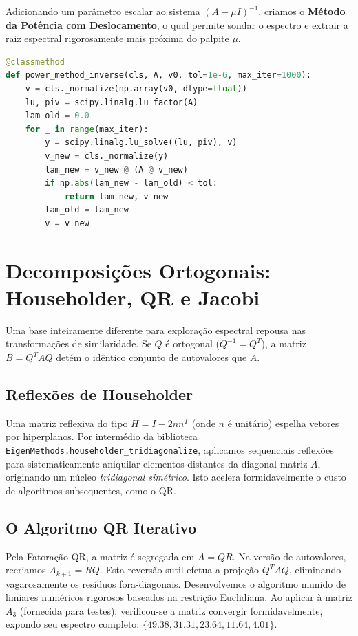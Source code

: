 \documentclass[12pt,a4paper]{article}
\begin{document}
Adicionando um parâmetro escalar ao sistema $(A - \mu I)^{-1}$, criamos o \textbf{Método da Potência com Deslocamento}, o qual permite sondar o espectro e extrair a raiz espectral rigorosamente mais próxima do palpite $\mu$.

\begin{lstlisting}[language=Python, caption={Extrato da Implementação da Potência Inversa com Fatoração LU}]
@classmethod
def power_method_inverse(cls, A, v0, tol=1e-6, max_iter=1000):
    v = cls._normalize(np.array(v0, dtype=float))
    lu, piv = scipy.linalg.lu_factor(A)
    lam_old = 0.0
    for _ in range(max_iter):
        y = scipy.linalg.lu_solve((lu, piv), v)
        v_new = cls._normalize(y)
        lam_new = v_new @ (A @ v_new)
        if np.abs(lam_new - lam_old) < tol:
            return lam_new, v_new
        lam_old = lam_new
        v = v_new
\end{lstlisting}

\section{Decomposições Ortogonais: Householder, QR e Jacobi}
Uma base inteiramente diferente para exploração espectral repousa nas transformações de similaridade. Se $Q$ é ortogonal ($Q^{-1} = Q^T$), a matriz $B = Q^T A Q$ detém o idêntico conjunto de autovalores que $A$.

\subsection{Reflexões de Householder}
Uma matriz reflexiva do tipo $H = I - 2nn^T$ (onde $n$ é unitário) espelha vetores por hiperplanos. Por intermédio da biblioteca \texttt{EigenMethods.householder\_tridiagonalize}, aplicamos sequenciais reflexões para sistematicamente aniquilar elementos distantes da diagonal matriz $A$, originando um núcleo \textit{tridiagonal simétrico}. 
Isto acelera formidavelmente o custo de algoritmos subsequentes, como o QR.

\subsection{O Algoritmo QR Iterativo}
Pela Fatoração QR, a matriz é segregada em $A = QR$. Na versão de autovalores, recriamos $A_{k+1} = R Q$.
Esta reversão sutil efetua a projeção $Q^T A Q$, eliminando vagarosamente os resíduos fora-diagonais. Desenvolvemos o algoritmo munido de limiares numéricos rigorosos baseados na restrição Euclidiana. Ao aplicar à matriz $A_3$ (fornecida para testes), verificou-se a matriz convergir formidavelmente, expondo seu espectro completo: $\{49.38, 31.31, 23.64, 11.64, 4.01\}$.
\end{document}
